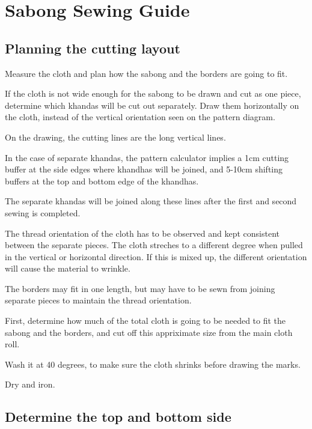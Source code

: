 \chapter{Sabong Sewing Guide}

\section{Planning the cutting layout}

Measure the cloth and plan how the sabong and the borders are going to
fit.

If the cloth is not wide enough for the sabong to be drawn and cut as
one piece, determine which khandas will be cut out separately. Draw them
horizontally on the cloth, instead of the vertical orientation seen on
the pattern diagram.

On the drawing, the cutting lines are the long vertical lines.

In the case of separate khandas, the pattern calculator implies a 1cm
cutting buffer at the side edges where khandhas will be joined, and
5-10cm shifting buffers at the top and bottom edge of the khandhas.

The separate khandas will be joined along these lines after the first
and second sewing is completed.

The thread orientation of the cloth has to be observed and kept
consistent between the separate pieces. The cloth streches to a
different degree when pulled in the vertical or horizontal direction. If
this is mixed up, the different orientation will cause the material to
wrinkle.

The borders may fit in one length, but may have to be sewn from joining
separate pieces to maintain the thread orientation.

First, determine how much of the total cloth is going to be needed to
fit the sabong and the borders, and cut off this appriximate size from
the main cloth roll.

Wash it at 40 degrees, to make sure the cloth shrinks before drawing the
marks.

Dry and iron.

\clearpage

\section{Determine the top and bottom side}

\setlength{\nextPhotoWidth}{0.4\textwidth}


